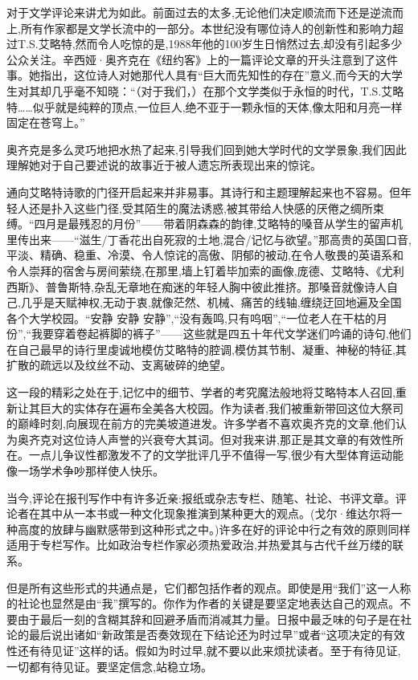 对于文学评论来讲尤为如此。前面过去的太多,无论他们决定顺流而下还是逆流而上,所有作家都是文学长流中的一部分。本世纪没有哪位诗人的创新性和影响力超过T.S.艾略特,然而令人吃惊的是,1988年他的100岁生日悄然过去,却没有引起多少公众关注。辛西娅·奥齐克在《纽约客》上的一篇评论文章的开头注意到了这件事。她指出，这位诗人对她那代人具有“巨大而先知性的存在”意义,而今天的大学生对其却几乎毫不知晓：“（对于我们，）在那个文学类似于永恒的时代，T.S.艾略特……似乎就是纯粹的顶点,一位巨人,绝不亚于一颗永恒的天体,像太阳和月亮一样固定在苍穹上。”

奥齐克是多么灵巧地把水热了起来,引导我们回到她大学时代的文学景象,我们因此理解她对于自己要述说的故事近于被人遗忘所表现出来的惊诧。

通向艾略特诗歌的门径开启起来并非易事。其诗行和主题理解起来也不容易。但年轻人还是扑入这些门径,受其陌生的魔法诱惑,被其带给人快感的厌倦之绸所束缚。“四月是最残忍的月份”——带着阴森森的韵律,艾略特的嗓音从学生的留声机里传出来——“滋生/丁香花出自死寂的土地,混合/记忆与欲望。”那高贵的英国口音,平淡、精确、稳重、冷漠、令人惊诧的高傲、阴郁的被动,在令人敬畏的英语系和令人崇拜的宿舍与房间萦绕,在那里,墙上钉着毕加索的画像,庞德、艾略特、《尤利西斯》、普鲁斯特,杂乱无章地在痴迷的年轻人胸中彼此推挤。那嗓音就像诗人自己,几乎是天赋神权,无动于衷,就像茫然、机械、痛苦的线轴,缠绕迂回地遍及全国各个大学校园。“安静 安静 安静”,“没有轰鸣,只有呜咽”,“一位老人在干枯的月份”,“我要穿着卷起裤脚的裤子”——这些就是四五十年代文学迷们吟诵的诗句,他们在自己最早的诗行里虔诚地模仿艾略特的腔调,模仿其节制、凝重、神秘的特征,其扩散的疏远以及纹丝不动、支离破碎的绝望。

这一段的精彩之处在于,记忆中的细节、学者的考究魔法般地将艾略特本人召回,重新让其巨大的实体存在遍布全美各大校园。作为读者,我们被重新带回这位大祭司的巅峰时刻,向展现在前方的完美坡道进发。许多学者不喜欢奥齐克的文章,他们认为奥齐克对这位诗人声誉的兴衰夸大其词。但对我来讲,那正是其文章的有效性所在。一点儿争议性都激发不了的文学批评几乎不值得一写,很少有大型体育运动能像一场学术争吵那样使人快乐。

当今,评论在报刊写作中有许多近亲:报纸或杂志专栏、随笔、社论、书评文章。评论者在其中从一本书或一种文化现象推演到某种更大的观点。(戈尔·维达尔将一种高度的放肆与幽默感带到这种形式之中。)许多在好的评论中行之有效的原则同样适用于专栏写作。比如政治专栏作家必须热爱政治,并热爱其与古代千丝万缕的联系。

但是所有这些形式的共通点是，它们都包括作者的观点。即使是用“我们”这一人称的社论也显然是由“我”撰写的。你作为作者的关键是要坚定地表达自己的观点。不要由于最后一刻的含糊其辞和回避矛盾而消减其力量。日报中最乏味的句子是在社论的最后说出诸如“新政策是否奏效现在下结论还为时过早”或者“这项决定的有效性还有待见证”这样的话。假如为时过早,就不要以此来烦扰读者。至于有待见证,一切都有待见证。要坚定信念,站稳立场。

